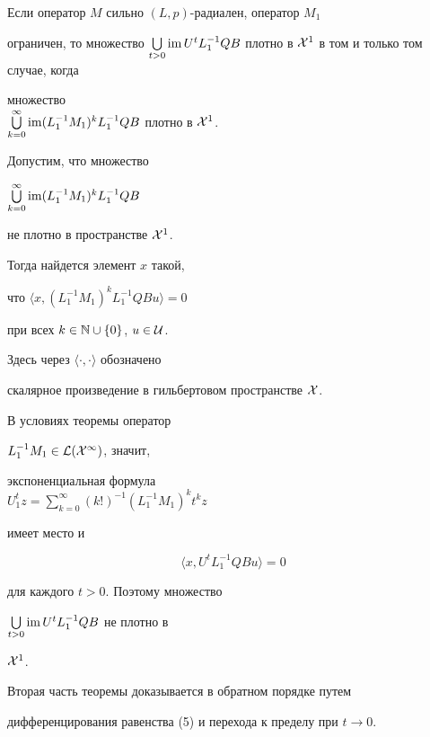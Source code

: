 \begin{thm}


Если оператор $M$ сильно $(L,p)$-радиален, оператор $M_1$


ограничен, то множество $\bigcup\limits_{t>0}\im


U^tL_1^{-1}Q B$ плотно в ${\cal X}^1$ в том и только том случае, когда


множество\\ $\bigcup\limits_{k=0}^{\infty} \im


(L_1^{-1}M_{1})^{k}L_1^{-1}Q B$ плотно в ${\cal X}^1$.


\end{thm}





\begin{pf}


Допустим, что множество


$\bigcup\limits_{k=0}^{\infty}\operatorname{im}(L_1^{-1}M_1)^kL_1^{-1}QB$


не плотно в пространстве ${\cal X}^1$.


Тогда найдется элемент $x$ такой,


что $\langle x,(L_1^{-1}M_1)^kL_1^{-1}Q B u\rangle =0$


при всех $k\in{\Bbb N}\cup\{0\}$, $u\in{\cal U}$.


Здесь через $\langle\cdot,\cdot\rangle$ обозначено


скалярное произведение в гильбертовом пространстве ${\cal X}$.


В условиях теоремы оператор


$L_1^{-1}M_1\in \cal L(\cal X^1)$, значит,


экспоненциальная формула\\ $U^t_1z=\sum\limits_{k=0}^{\infty}


(k!)^{-1}(L_1^{-1}M_1)^k t^k z$


имеет место и


\begin{equation}


\langle x,U^t L_1^{-1}Q B u \rangle =0


\end{equation}


для каждого $t>0$. Поэтому множество


$\bigcup\limits_{t>0} \operatorname{im} U^tL_1^{-1}QB$ не плотно в


${\cal X}^1$.





Вторая часть теоремы доказывается в обратном порядке путем 


дифференцирования равенства (5) и перехода к пределу при $t\to0$.


\end{pf}





